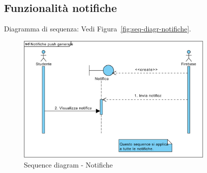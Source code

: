 \subsection{Funzionalità notifiche}

Diagramma di sequenza: Vedi Figura~\vref{fig:seq-diagr-notifiche}.

\begin{figure}
	\centering
	\includegraphics[width=0.85\textwidth]{imgs/gruppo2/sequence-notifiche}
	\caption{Sequence diagram - Notifiche}
	\label{fig:seq-diagr-notifiche}
\end{figure}

\clearpage